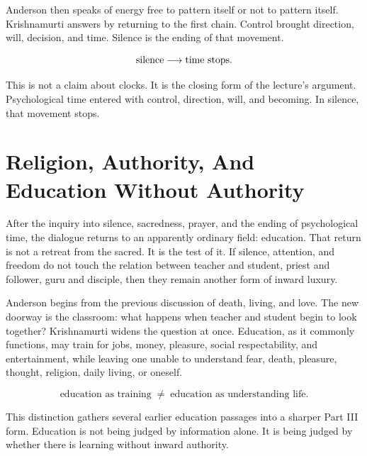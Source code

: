 \documentclass[11pt,oneside]{book}
\begin{document}
Anderson then speaks of energy free to pattern itself or not to pattern itself. Krishnamurti answers by returning to the first chain. Control brought direction, will, decision, and time. Silence is the ending of that movement.

\begin{equation}
\hbox{silence}
\longrightarrow
\hbox{time stops}.
\end{equation}

This is not a claim about clocks. It is the closing form of the lecture's argument. Psychological time entered with control, direction, will, and becoming. In silence, that movement stops.


\chapter{Religion, Authority, And Education Without Authority}

After the inquiry into silence, sacredness, prayer, and the ending of psychological time, the dialogue returns to an apparently ordinary field: education. That return is not a retreat from the sacred. It is the test of it. If silence, attention, and freedom do not touch the relation between teacher and student, priest and follower, guru and disciple, then they remain another form of inward luxury.

Anderson begins from the previous discussion of death, living, and love. The new doorway is the classroom: what happens when teacher and student begin to look together? Krishnamurti widens the question at once. Education, as it commonly functions, may train for jobs, money, pleasure, social respectability, and entertainment, while leaving one unable to understand fear, death, pleasure, thought, religion, daily living, or oneself.

\begin{equation}
\text{education as training}
\;\not=\;
\text{education as understanding life}.
\end{equation}

This distinction gathers several earlier education passages into a sharper Part III form. Education is not being judged by information alone. It is being judged by whether there is learning without inward authority.
\end{document}
